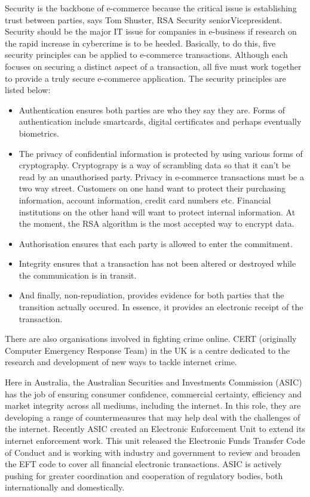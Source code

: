 \documentclass[11pt,a4paper,twoside,notitlepage]{article}
\begin{document}
Security is the backbone of e-commerce because the critical issue is establishing trust between
parties, says Tom Shuster, RSA Security seniorVicepresident. Security should be the major IT
issue for companies in e-business if research on the rapid increase in cybercrime is to be 
heeded\cite{Whitby:BD00}. 
Basically, to do this, five security principles can be applied to e-commerce transactions.  Although each focuses on securing a 
distinct aspect of a transaction, all five must work together to provide a truly secure e-commerce application. The security principles are listed below:

\begin{itemize}
	\item Authentication ensures both parties are who they say they are.  Forms of authentication include smartcards,
digital certificates and perhaps eventually biometrics.

	\item The privacy of confidential information is protected by using various forms of cryptography. Cryptograpy is a way of
scrambling data so that it can't be read by an unauthorised party.  Privacy in e-commerce transactions
must be a two way street.  Customers on one hand want to protect their purchasing information, account information,
credit card numbers etc.  Financial institutions on the other hand will want to protect internal information.
At the moment, the RSA algorithm is the most accepted way to encrypt data.

	\item Authorisation ensures that each party is allowed to enter the commitment.

	\item Integrity ensures that a transaction  has not been altered or destroyed while the communication is in transit.

	\item And finally, non-repudiation, provides evidence for both parties that the transition actually occured.
In essence, it provides an electronic receipt of the transaction\cite{anon:ABF00}.
\end{itemize}
There are also organisations involved in fighting crime online.  CERT (originally Computer Emergency Response
Team) in the UK is a centre dedicated to the research and development of new ways to tackle internet crime\cite{August:Comp00}.

Here in Australia, the Australian Securities and Investments Commission (ASIC) has the job of
ensuring consumer confidence, commercial certainty, efficiency and market integrity across all
mediums, including the internet.  In this role, they are developing a range of countermeasures that
may help deal with the challenges of the internet.  Recently ASIC created an Electronic Enforcement
Unit to extend its internet enforcement work.  This unit released the Electronic Funds Transfer Code
of Conduct and is working with industry and government to review and broaden the EFT code to cover
all financial electronic transactions.  ASIC is actively pushing for greater coordination and 
cooperation of regulatory bodies, both internationally and domestically\cite{Phillips:Age99}. 
\end{document}

